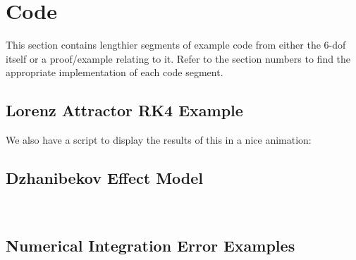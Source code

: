 \documentclass[12pt]{report}
\begin{document}

\section{Code}
This section contains lengthier segments of example code from either the 6-\gls{dof} itself or a proof/example relating to it. Refer to the section numbers to find the appropriate implementation of each code segment.
\subsection{Lorenz Attractor RK4 Example}\label{sec:Lorenz Attractor RK4 Example}
\label{code:Lorenz}

We also have a script to display the results of this in a nice animation:

\label{code:LorenzAnim}
\subsection{Dzhanibekov Effect Model}
\label{code:DzhanMain}

\label{code:DzhanInt}

\label{code:DzhanRotVis}\


\subsection{Numerical Integration Error Examples}
\label{code:Numerical Error $y'=2t$}

\label{code:Numerical Error y'=cos(4*pi*t)}

\printglossary[title=Special Terms, toctitle = Special Terms]

\printbibliography[heading=bibintoc, title={References}]
\end{document}
